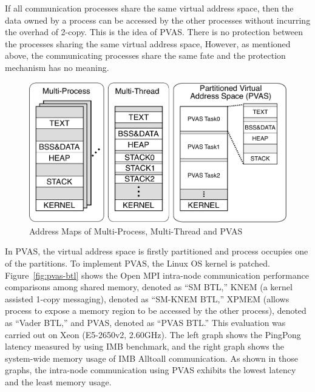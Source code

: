 If all communication processes share the same virtual address space,
then the data owned by a process can be accessed by the other
processes without incurring the overhad of 2-copy. This is the idea of
PVAS\cite{110009850784,Shimada:2014:ECC:2642769.2642790,SHIMADA:PGAS12,Shimada:2013:PNT:2489068.2489075,shimada-thesis}. There
is no protection between the processes sharing the same virtual
address space, However, as mentioned above, the communicating
processes share the same fate and the protection mechanism has no
meaning. 

\begin{figure}[ht]
\begin{center}
\includegraphics[width=0.8\columnwidth]{Figs/PVAS.pdf}
  \caption{Address Maps of Multi-Process, Multi-Thread and PVAS}
  \label{fig:pvas-map}
\end{center}
\end{figure}

In PVAS, the virtual address space is  
firstly partitioned and process occupies one of the partitions. To
implement PVAS, the Linux OS kernel is patched. 
Figure~\ref{fig:pvas-btl} shows the Open MPI intra-node communication
performance comparisons among shared memory, denoted as ``SM BTL,''
KNEM (a kernel assisted 1-copy messaging), denoted as ``SM-KNEM BTL,''
XPMEM (allows process to expose a memory region to be accessed by the
other process), denoted as ``Vader BTL,'' and PVAS, denoted as ``PVAS
BTL.'' This evaluation was carried out on Xeon (E5-2650v2,
2.60GHz). The left graph shows the PingPong latency measured by using
IMB benchmark, and the right graph shows the system-wide memory usage
of IMB Alltoall communication. As shown in those graphs, the
intra-node communication using PVAS exhibits the lowest latency and
the least memory usage. 


